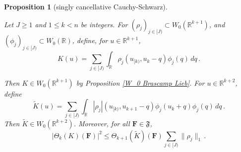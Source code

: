 \documentclass[12pt,reqno]{amsart}
\theoremstyle{plain}
\newtheorem{proposition}[theorem]{Proposition}
\numberwithin{equation}{section}
\theoremstyle{remark}
\newcommand{\uses}[1]{}
\newcommand{\usesdefs}[1]{}
\newcommand{\leanok}{}
\newcommand{\lean}[1]{}
\newcommand{\R}{{\mathbb R}}
\newcommand{\F}{\mathbf{F}}
\begin{document}
\begin{proposition}[singly cancellative Cauchy-Schwarz]\label{single cancellative Cauchy-Schwarz}\uses{cube BL inequality,W_0 Brascamp Lieb}\usesdefs{auto:Wiener-space-definition,normalized function tuples,cube Brascamp--Lieb,prism Brascamp--Lieb}
\lean{Auto.singlyCancellativeKernel_memW0,Auto.singlyCancellativeLift_memW0,Auto.singlyCancellativeCauchySchwarz_bound}
\leanok
Let $J\ge 1$ and $1\le k<n$ be integers. For
$(\rho_j)_{j\in [J)}\subset W_0(\R^{k+1})$, and
$(\phi_j)_{j\in [J)}\subset W_0(\R)$, define, for $u\in \R^{k+1}$,
\begin{equation}\label{auto:Cauchy-Schwarz-kernel-K}
    K(u)=\sum_{j\in[J)}\int_\R \rho_j(u_{[k)},u_k-q)\phi_j(q)\,dq\,.
\end{equation}

Then $K\in W_0(\R^{k+1})$ by Proposition \ref{W_0 Brascamp Lieb}.
For $u\in \R^{k+2}$, define
\begin{equation}\label{auto:Cauchy-Schwarz-kernel-tilde-K}
    \tilde{K}(u)=\sum_{j\in[J)}\int_\R
    |\rho_j|(u_{[k)},u_{k+1}-q)\phi_j(u_k+q)\phi_j(q)\,dq\, .
\end{equation}
Then $\tilde{K}\in W_0(\R^{k+2})$.
Moreover, for all $\F\in\mathfrak{F}$,
\begin{equation}\label{auto:Cauchy-Schwarz-at-k-bound}
    |\Theta_k(K)(\F)|^2
    \le \Theta_{k+1}(\tilde{K})(\F)\sum_{j\in[J)}\|\rho_j\|_1\, .
\end{equation}
\end{proposition}
\end{document}
